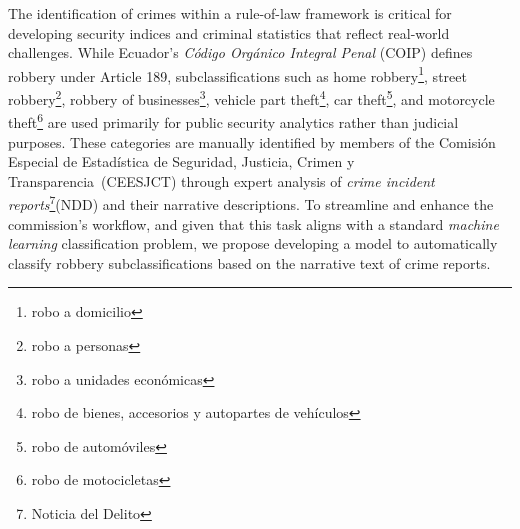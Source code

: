 \documentclass[onecolumn, journal, english, 12pt, a4paper]{IEEEtran} %
\newcommand{\printnombrecomision}{Comisión Especial de Estadística de Seguridad, Justicia, Crimen y Transparencia}
\theoremstyle{definition}
\begin{document}
The identification of crimes within a rule-of-law framework is
critical for developing security indices and criminal statistics that
reflect real-world challenges. While Ecuador’s \emph{Código Orgánico
  Integral Penal} (COIP) defines robbery under Article 189,
subclassifications such as home robbery\footnote{robo a domicilio},
street robbery\footnote{robo a personas}, robbery of
businesses\footnote{robo a unidades económicas}, vehicle part
theft\footnote{robo de bienes, accesorios y autopartes de vehículos},
car theft\footnote{robo de automóviles}, and motorcycle
theft\footnote{robo de motocicletas} are used primarily for public
security analytics rather than judicial purposes. These categories are
manually identified by members of the \printnombrecomision\ (CEESJCT)
through expert analysis of \textit{crime incident
  reports}\footnote{Noticia del Delito}(NDD) and their narrative
descriptions. To streamline and enhance the commission’s workflow, and
given that this task aligns with a standard \emph{machine learning}
classification problem, we propose developing a model to automatically
classify robbery subclassifications based on the narrative text of
crime reports.
\end{document}
